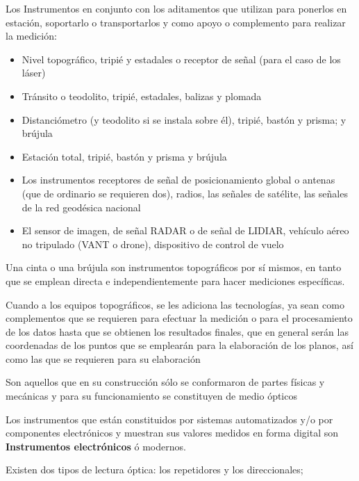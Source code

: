 Los Instrumentos en conjunto con los aditamentos que utilizan para ponerlos en estación, soportarlo o transportarlos y como apoyo o complemento para realizar la medición:

\begin{itemize}
    \item Nivel topográfico, tripié y estadales o receptor de señal (para el caso de los láser)
    \item Tránsito o teodolito, tripié, estadales, balizas y plomada
    \item Distanciómetro (y teodolito si se instala sobre él), tripié, bastón y prisma; y brújula
    \item Estación total, tripié, bastón y prisma y brújula
    \item Los instrumentos receptores de señal de posicionamiento global o antenas (que de ordinario se requieren dos), radios, las señales de satélite, las señales de la red geodésica nacional
    \item El sensor de imagen, de señal RADAR o de señal de LIDIAR, vehículo aéreo no tripulado (VANT o drone), dispositivo de control de vuelo
\end{itemize}

Una cinta o una brújula son instrumentos topográficos por sí mismos, en tanto que se emplean directa e independientemente para hacer mediciones específicas.

\begin{definition}
    Cuando a los equipos topográficos, se les adiciona las tecnologías, ya sean como complementos que se requieren para efectuar la medición o para el procesamiento de los datos hasta que se obtienen los resultados finales, que en general serán las coordenadas de los puntos que se emplearán para la elaboración de los planos, así como las que se requieren para su elaboración
\end{definition}

\begin{definition}
    Son aquellos que en su construcción sólo se conformaron de partes físicas y mecánicas y para su funcionamiento se constituyen de medio ópticos
\end{definition}

Los instrumentos que están constituidos por sistemas automatizados y/o por componentes electrónicos y muestran sus valores medidos en forma digital son \textbf{Instrumentos electrónicos} ó modernos. 

Existen dos tipos de lectura óptica: los repetidores y los direccionales;

